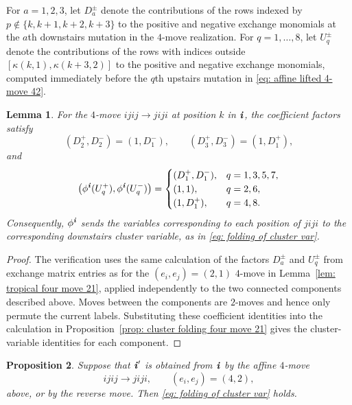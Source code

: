 \documentclass[12pt, leqno]{amsart}
\numberwithin{equation}{section}
\theoremstyle{plain}
\newtheorem{lemma}{Lemma}[section]
\newtheorem{proposition}[lemma]{Proposition}
\theoremstyle{definition}
\newcommand{\ii}{ \textbf{\textit{i}}}
\begin{document}
For $a=1,2,3$, let $D_a^\pm$ denote the contributions of the rows
indexed by $p\notin\{k,k+1,k+2,k+3\}$ to the positive and negative
exchange monomials at the $a$th downstairs mutation in the $4$-move
realization.
For $q=1,\ldots,8$, let $U_q^\pm$ denote the contributions of the rows
with indices outside $[\kappa(k,1),\kappa(k+3,2)]$ to the positive
and negative exchange monomials, computed immediately before
the $q$th upstairs mutation in \eqref{eq: affine lifted 4-move 42}.

\begin{lemma}
\label{lem: coefficient folding four move 42}
 For the $4$-move $ijij\longrightarrow jiji$ at position $k$ in
$\ii$, the coefficient factors satisfy
\[
(D_2^+,D_2^-)=(1,D_1^-),\qquad
(D_3^+,D_3^-)=(1,D_1^+),
\]
 and
\[
\bigl(\phi^\ii(U_q^+),\phi^\ii(U_q^-)\bigr)=
\begin{cases}
(D_1^+,D_1^-),&q=1,3,5,7,\\
(1,1),&q=2,6,\\
(1,D_1^+),&q=4,8.
\end{cases}
\]
 Consequently, $\phi^\ii$ sends the variables corresponding to each position of $jiji$ to the corresponding downstairs cluster variable, as in \eqref{eq: folding of cluster var}.
\end{lemma}

\begin{proof}
The verification uses the same calculation of the factors $D_a^\pm$ and $U_q^\pm$ from exchange matrix entries as for the $(e_i,e_j)=(2,1)$ $4$-move 
in Lemma~\ref{lem: tropical four move 21},
applied independently to the two  connected{} components described above.
Moves between the components are
$2$-moves and hence only permute the current labels.   Substituting these coefficient identities into the calculation in
Proposition~\ref{prop: cluster folding four move 21} gives the
cluster-variable identities for each component.
\end{proof}

\begin{proposition}
\label{prop: cluster variable folding four move 42}
Suppose that $\ii'$ is obtained from $\ii$ by the affine $4$-move
\[
 ijij\longrightarrow jiji,\qquad(e_i,e_j)=(4,2),
\]
above, or by  the reverse move.  Then
\eqref{eq: folding of cluster var} holds.
\end{proposition}
\end{document}
